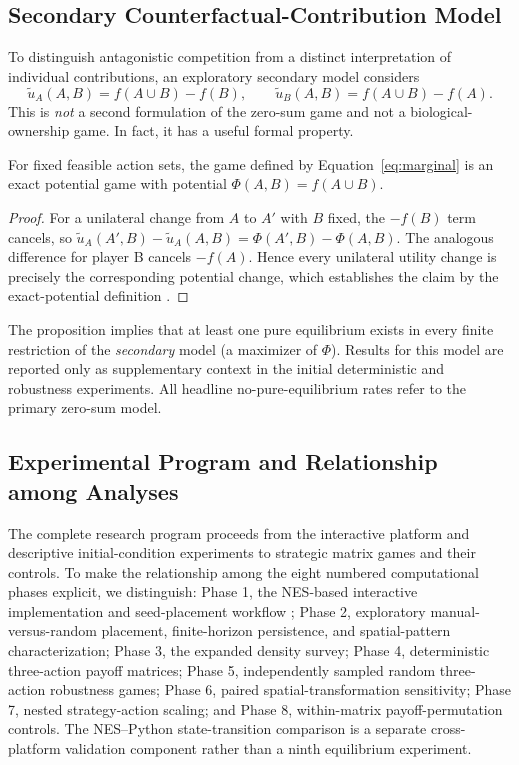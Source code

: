 \documentclass[games,article,submit,moreauthors]{Definitions/mdpi}
\begin{document}
\subsection{Secondary Counterfactual-Contribution Model}

To distinguish antagonistic competition from a distinct interpretation of individual contributions, an exploratory secondary model considers
\begin{equation}\label{eq:marginal}
\widetilde u_A(A,B)=f(A\cup B)-f(B),\qquad
\widetilde u_B(A,B)=f(A\cup B)-f(A).
\end{equation}
This is \emph{not} a second formulation of the zero-sum game and not a biological-ownership game. In fact, it has a useful formal property.

\begin{Proposition}\label{prop:potential}
For fixed feasible action sets, the game defined by Equation~\eqref{eq:marginal} is an exact potential game with potential $\Phi(A,B)=f(A\cup B)$.
\end{Proposition}
\begin{proof}
For a unilateral change from $A$ to $A'$ with $B$ fixed, the $-f(B)$ term cancels, so $\widetilde u_A(A',B)-\widetilde u_A(A,B)=\Phi(A',B)-\Phi(A,B)$. The analogous difference for player B cancels $-f(A)$. Hence every unilateral utility change is precisely the corresponding potential change, which establishes the claim by the exact-potential definition \citep{monderer1996}.
\end{proof}

The proposition implies that at least one pure equilibrium exists in every finite restriction of the \emph{secondary} model (a maximizer of $\Phi$). Results for this model are reported only as supplementary context in the initial deterministic and robustness experiments. All headline no-pure-equilibrium rates refer to the primary zero-sum model.

\subsection{Experimental Program and Relationship among Analyses}\label{sec:roadmap}

The complete research program proceeds from the interactive platform and descriptive initial-condition experiments to strategic matrix games and their controls. To make the relationship among the eight numbered computational phases explicit, we distinguish: Phase 1, the NES-based interactive implementation and seed-placement workflow \citep{senzio2026nes}; Phase 2, exploratory manual-versus-random placement, finite-horizon persistence, and spatial-pattern characterization; Phase 3, the expanded density survey; Phase 4, deterministic three-action payoff matrices; Phase 5, independently sampled random three-action robustness games; Phase 6, paired spatial-transformation sensitivity; Phase 7, nested strategy-action scaling; and Phase 8, within-matrix payoff-permutation controls. The NES--Python state-transition comparison is a separate cross-platform validation component rather than a ninth equilibrium experiment.
\end{document}
